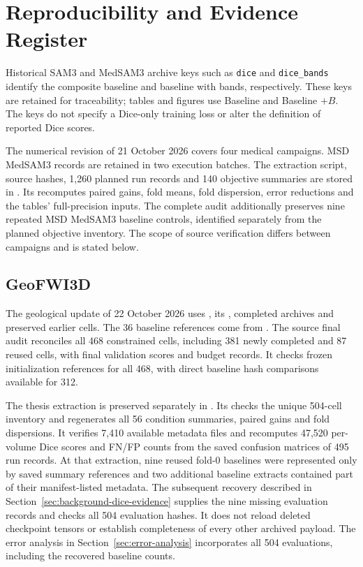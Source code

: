 \section{Reproducibility and Evidence Register}
\label{sec:evidence-register}

Historical SAM3 and MedSAM3 archive keys such as \texttt{dice} and
\texttt{dice\_bands} identify the composite baseline and baseline with
bands, respectively. These keys are retained for traceability; tables
and figures use Baseline and Baseline $+B$. The keys do not specify a
Dice-only training loss or alter the definition of reported Dice scores.

The numerical revision of 21 October 2026 covers four medical
campaigns. MSD MedSAM3 records are retained in two execution batches. The extraction script, source hashes,
1,260 planned run records and 140 objective summaries are stored in
. Its
 recomputes paired gains, fold means, fold dispersion,
error reductions and the tables' full-precision inputs. The complete
audit additionally preserves nine repeated MSD MedSAM3 baseline
controls, identified separately from the planned objective inventory.
The scope of
source verification differs between campaigns and is stated below.

\subsection{GeoFWI3D}

The geological update of 22 October 2026 uses
, its
, completed archives and preserved earlier
cells. The 36 baseline references come from
.
The source final audit reconciles all 468 constrained cells, including
381 newly completed and 87 reused cells, with final validation scores
and budget records. It checks frozen initialization references for
all 468, with direct baseline hash comparisons available for 312.

The thesis extraction is preserved separately in
. Its 
checks the unique 504-cell inventory and regenerates all 56 condition
summaries, paired gains and fold dispersions. It verifies 7,410
available metadata files and recomputes 47,520 per-volume Dice scores
and FN/FP counts from the saved confusion matrices of 495 run records.
At that extraction, nine reused fold-0 baselines were represented
only by saved summary references and two additional baseline extracts
contained part of their manifest-listed metadata. The subsequent
recovery described in Section~\ref{sec:background-dice-evidence}
supplies the nine missing evaluation records and checks all 504
evaluation hashes. It does not reload deleted checkpoint tensors
or establish completeness of every other archived payload. The
error analysis in Section~\ref{sec:error-analysis} incorporates
all 504 evaluations, including the recovered baseline counts.

